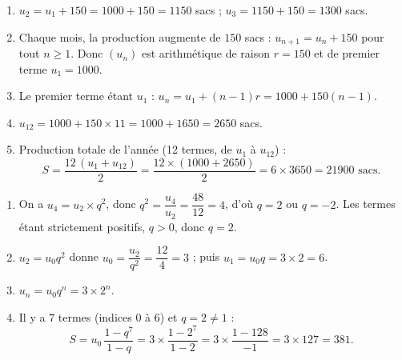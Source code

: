 \documentclass[11pt]{article}
\begin{document}
\begin{corrige}
\begin{enumerate}
\item $u_2 = u_1 + 150 = \num{1000} + 150 = \num{1150}$ sacs ; $u_3 = \num{1150} + 150 = \num{1300}$ sacs.
\item Chaque mois, la production augmente de $150$ sacs : $u_{n+1} = u_n + 150$ pour tout $n \ge 1$. Donc $(u_n)$ est arithmétique de raison $r = 150$ et de premier terme $u_1 = \num{1000}$.
\item Le premier terme étant $u_1$ : $u_n = u_1 + (n-1)r = \num{1000} + 150(n-1)$.
\item $u_{12} = \num{1000} + 150\times 11 = \num{1000} + \num{1650} = \num{2650}$ sacs.
\item Production totale de l'année (12 termes, de $u_1$ à $u_{12}$) :
\[ S = \frac{12\,(u_1 + u_{12})}{2} = \frac{12\times(\num{1000} + \num{2650})}{2} = 6 \times \num{3650} = \num{21900} \text{ sacs}. \]
\end{enumerate}
\end{corrige}

\begin{corrige}
\begin{enumerate}
\item On a $u_4 = u_2 \times q^2$, donc $q^2 = \dfrac{u_4}{u_2} = \dfrac{48}{12} = 4$, d'où $q = 2$ ou $q = -2$. Les termes étant strictement positifs, $q > 0$, donc $\boxed{q = 2}$.
\item $u_2 = u_0 q^2$ donne $u_0 = \dfrac{u_2}{q^2} = \dfrac{12}{4} = 3$ ; puis $u_1 = u_0 q = 3\times 2 = 6$.
\item $u_n = u_0 q^n = 3 \times 2^n$.
\item Il y a $7$ termes (indices $0$ à $6$) et $q = 2 \neq 1$ :
\[ S = u_0\,\frac{1 - q^{7}}{1 - q} = 3\times\frac{1 - 2^7}{1 - 2} = 3\times\frac{1 - 128}{-1} = 3\times 127 = 381. \]
\end{enumerate}
\end{corrige}
\end{document}
